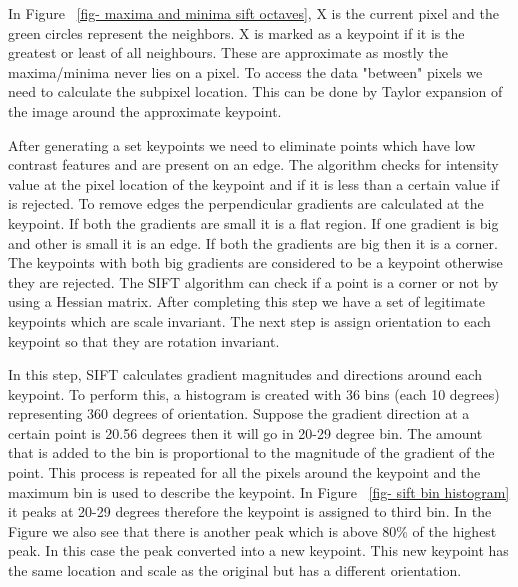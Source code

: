 \documentclass[12pt]{dalcsthesis}
\begin{document}
In Figure ~\ref{fig- maxima and minima sift octaves}, X is the current pixel and the green circles represent the neighbors. X is marked as a keypoint if it is the greatest or least of all neighbours. These are approximate as mostly the maxima/minima never lies on a pixel. To access the data "between" pixels we need to calculate the subpixel location. This can be done by Taylor expansion of the image around the approximate keypoint.

After generating a set keypoints we need to eliminate points which have low contrast features and are present on an edge. The algorithm checks for intensity value at the pixel location of the keypoint and if it is less than a certain value if is rejected. To remove edges the perpendicular gradients are calculated at the keypoint. If both the gradients are small it is a flat region. If one gradient is big and other is small it is an edge. If both the gradients are big then it is a corner. The keypoints with both big gradients are considered to be a keypoint otherwise they are rejected. The SIFT algorithm can check if a point is a corner or not by using a Hessian matrix. After completing this step we have a set of legitimate keypoints which are scale invariant. The next step is assign orientation to each keypoint so that they are rotation invariant.

In this step, SIFT calculates gradient magnitudes and directions around each keypoint. To perform this, a histogram is created with 36 bins (each 10 degrees) representing 360 degrees of orientation. Suppose the gradient direction at a certain point is 20.56 degrees then it will go in 20-29 degree bin. The amount that is added to the bin is proportional to the magnitude of the gradient of the point. This process is repeated for all the pixels around the keypoint and the maximum bin is used to describe the keypoint. In Figure ~\ref{fig- sift bin histogram} it peaks at 20-29 degrees therefore the keypoint is assigned to third bin. In the Figure we also see that there is another peak which is above 80\% of the highest peak. In this case the peak converted into a new keypoint. This new keypoint has the same location and scale as the original but has a different orientation. 
\end{document}

